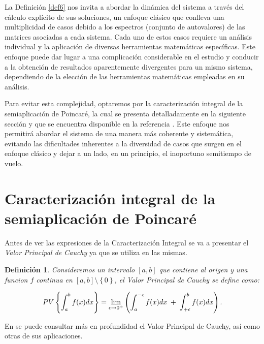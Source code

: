 \documentclass[12pt,a4paper]{report} %
\newtheorem{definicion}{Definición}[chapter]
\newtheorem{definicion}{Definición}[chapter] %
\begin{document}
	
	\vspace{0.5cm}La Definición \ref{def6} nos invita a abordar la dinámica del sistema a través del cálculo explícito de sus soluciones, un enfoque clásico que conlleva una multiplicidad de casos debido a los espectros (conjunto de autovalores) de las matrices asociadas a cada sistema. Cada uno de estos casos requiere un análisis individual y la aplicación de diversas herramientas matemáticas específicas. Este enfoque puede dar lugar a una complicación considerable en el estudio y conducir a la obtención de resultados aparentemente divergentes para un mismo sistema, dependiendo de la elección de las herramientas matemáticas empleadas en su análisis.
	
	\vspace{0.5cm}\noindent Para evitar esta complejidad, optaremos por la caracterización integral de la semiaplicación de Poincaré, la cual se presenta detalladamente en la siguiente sección y que se encuentra disponible en la referencia \cite{caracterizacion}. Este enfoque nos permitirá abordar el sistema de una manera más coherente y sistemática, evitando las dificultades inherentes a la diversidad de casos que surgen en el enfoque clásico y dejar a un lado, en un principio, el inoportuno semitiempo de vuelo.
	\newpage
	
	\section{Caracterización integral de la semiaplicación de Poincaré}
	
	
	\vspace{0.5cm} Antes de ver las expresiones de la Caracterización Integral se va a presentar el \textit{Valor Principal de Cauchy} ya que se utiliza en las mismas.
	\begin{definicion}
	
	 Consideremos un intervalo $[a,b]$ que contiene al origen y una funcion $f$ continua en $[a,b] \setminus \left\{0\right\}$, el Valor Principal de Cauchy se define como:
	
	\begin{equation}
		\scalebox{1}{$\displaystyle
			PV\left\{\int_{a}^{b}f(x)dx\right\}= \lim_{\epsilon \to 0^+}\left(
			\int_{a}^{-\epsilon}f(x)dx \; + \; 
			\int_{+\epsilon}^{b}f(x)dx
			\right).
			$}
	\end{equation}\smallskip
	
    \end{definicion}
    
	\noindent En \cite{pv} se puede consultar más en profundidad el Valor Principal de Cauchy, así como otras de sus aplicaciones.
	
\end{document}
